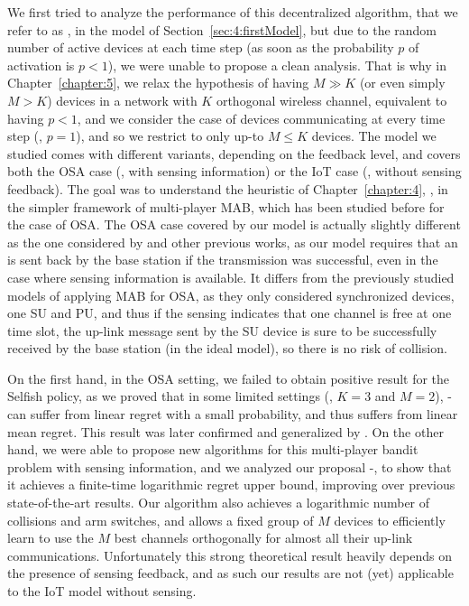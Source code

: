 We first tried to analyze the performance of this decentralized algorithm, that we refer to as \Selfish, in the model of Section~\ref{sec:4:firstModel},
but due to the random number of active devices at each time step (as soon as the probability $p$ of activation is $p < 1$), we were unable to propose a clean analysis.
%
That is why in Chapter~\ref{chapter:5}, we relax the hypothesis of having $M \gg K$ (or even simply $M > K$) devices in a network with $K$ orthogonal wireless channel, equivalent to having $p < 1$, and we consider the case of devices communicating at every time step (\ie, $p=1$), and so we restrict to only up-to $M \leq K$ devices.
The model we studied comes with different variants, depending on the feedback level, and covers both the OSA case (\ie, with sensing information) or the IoT case (\ie, without sensing feedback).
The goal was to understand the heuristic of Chapter~\ref{chapter:4}, \Selfish, in the simpler framework of multi-player MAB, which has been studied before \cite{Zhao10,Anandkumar10,Anandkumar11} for the case of OSA.
%
The OSA case covered by our model is actually slightly different as the one considered by \cite{Jouini10} and other previous works,
as our model requires that an \Ack{} is sent back by the base station if the transmission was successful, even in the case where sensing information is available.
It differs from the previously studied models of applying MAB for OSA, as they only considered synchronized devices, one SU and PU, and thus if the sensing indicates that one channel is free at one time slot, the up-link message sent by the SU device is sure to be successfully received by the base station (in the ideal model), so there is no risk of collision.


On the first hand, in the OSA setting, we failed to obtain positive result for the Selfish policy, as we proved that in some limited settings (\eg, $K=3$ and $M=2$), \Selfish-\UCB{} can suffer from linear regret with a small probability, and thus suffers from linear mean regret.
This result was later confirmed and generalized by \cite{BoursierPerchet18}.
%
On the other hand, we were able to propose new algorithms for this multi-player bandit problem with sensing information, and we analyzed our proposal \MCTopM-\klUCB, to show that it achieves a finite-time logarithmic regret upper bound, improving over previous state-of-the-art results.
Our algorithm also achieves a logarithmic number of collisions and arm switches, and allows a fixed group of $M$ devices to efficiently learn to use the $M$ best channels orthogonally for almost all their up-link communications.
%
Unfortunately this strong theoretical result heavily depends on the presence of sensing feedback, and as such our results are not (yet) applicable to the IoT model without sensing.

